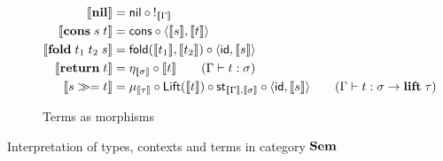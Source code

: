 \begin{figure}
\begin{subfigure}{0.8\linewidth}
\begin{align*}
  \\
  \sem{\tmNil} &= \nil \comp {!_{\sem{\Gamma}}}
  \\
  \sem{\tmCons{s}{t}} &= \cons \comp \prodM{\sem{s}}{\sem{t}}
  \\
  \sem{\tmFoldList{t_1}{t_2}{s}} &= \fold(\sem{t_1},\sem{t_2}) \comp \prodM{\id}{\sem{s}}
  \\
  \sem{\tmReturn{t}} &= \eta_{\sem{\sigma}} \comp \sem{t}
  \tag*{($\Gamma \vdash t: \sigma$)}
  \\
  \sem{\tmBind{s}{t}} &= \mu_{\sem{\tau}} \comp \Lift(\sem{t}) \comp \mathsf{st}_{\sem{\Gamma},\sem{\sigma}} \comp \prodM{\id}{\sem{s}}
  \tag*{($\Gamma \vdash t: \sigma \to \tyLift\;\tau$)}
  \end{align*}
  \caption{Terms as morphisms}
  \label{fig:semantics:terms}
\end{subfigure}
\caption{Interpretation of types, contexts and terms in category $\mathbf{Sem}$}
\end{figure}
